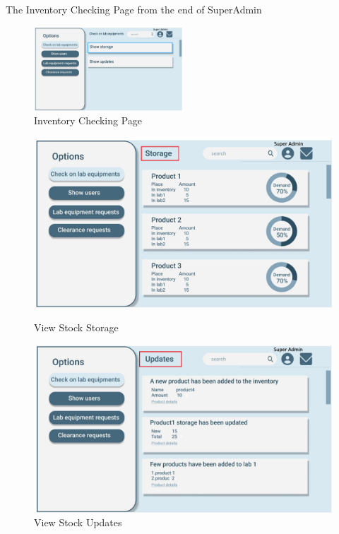 \documentclass[20pt]{beamer}
\numberwithin{figure}{section}
\begin{document}
\begin{frame}{The Inventory Checking Page from the end of SuperAdmin}

    \begin{figure}

        \centering
        \includegraphics[width= 0.5\textwidth , height= 0.3\paperheight]{SuperAdminInventoryCheck1.png}
            \caption{Inventory Checking Page}
        \label{fig:63}
        
    \end{figure}

    

    \begin{figure}

        \centering

        \begin{minipage}[b]{0.45\textwidth}
            \centering
            \includegraphics[width= \textwidth , height= 0.2\paperheight]{SuperAdminInventoryCheck2.png}
            \caption{View Stock Storage}
            \label{fig:64}
        \end{minipage}
        \begin{minipage}[b]{0.45\textwidth}
            \centering
            \includegraphics[width= \textwidth , height= 0.2\paperheight]{SuperAdminInventoryCheck3.png}
            \caption{View Stock Updates}
            \label{fig:65}


\end{minipage}
\end{figure}
\end{frame}
\end{document}
